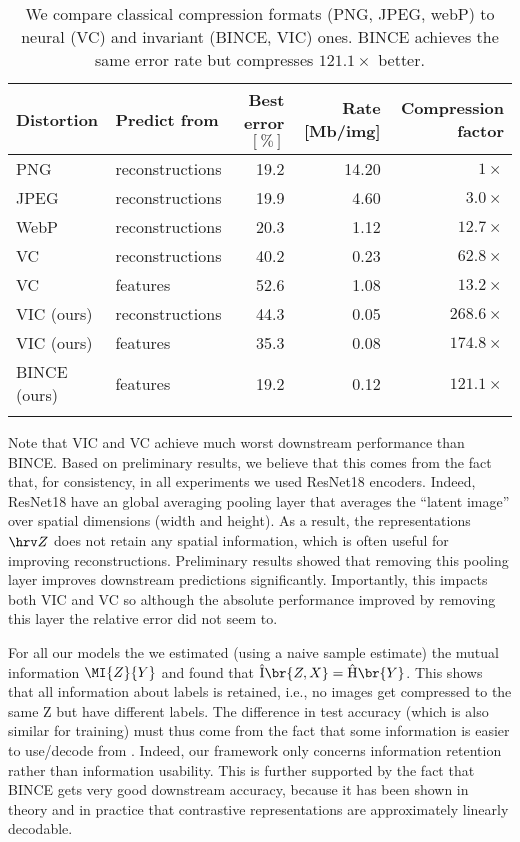 \documentclass[final]{article}
\begin{document}
\begin{table}[ht]
\caption{
We compare classical compression formats (PNG, JPEG, webP) to neural (VC) and invariant (BINCE, VIC) ones. 
BINCE achieves the same error rate but compresses $ 121.1 \times$ better.
}
\center
\small
\begin{tabular}{llrrr}
\toprule
Distortion  & Predict from & Best error $[\%]$  & Rate [Mb/img] & Compression factor\\ 
\midrule 
PNG \cite{graphics_png_isoiec_2003}    &  reconstructions   &  19.2 & 14.20 & $ 1\times$ \\
JPEG  \cite{group_jpeg_itu-t_1992} &  reconstructions   &  19.9 &  4.60 & $ 3.0\times$ \\
WebP   \cite{webp_google_2018}&  reconstructions   &  20.3 &   1.12 & $ 12.7\times$ \\
VC     &  reconstructions   &  40.2 &   0.23 & $ 62.8\times$ \\
VC     &  features          &  52.6 &   1.08 & $ 13.2\times$ \\
\midrule 
VIC (ours)   &  reconstructions  &  44.3 &   0.05 & $ 268.6\times$ \\
VIC  (ours)  &  features 	     &  35.3 &   0.08 & $ 174.8\times$ \\
BINCE (ours) &  features         &  19.2 &   0.12 & $ 121.1\times$ \\	
\bottomrule
\label{table:distortion_variation_long}
\end{tabular}
\end{table}

 
Note that VIC and VC achieve much worst downstream performance than BINCE.
Based on preliminary results, we believe that this comes from the fact that, for consistency, in all experiments we used ResNet18 encoders.
Indeed, ResNet18 have an global averaging pooling layer that averages the ``latent image'' over spatial dimensions (width and height).
As a result, the representations $\hrv Z$ does not retain any spatial information, which is often useful for improving reconstructions.
Preliminary results showed that removing this pooling layer improves downstream predictions significantly.
Importantly, this impacts both VIC and VC so although the absolute performance improved by removing this layer the relative error did not seem to.

 For all our models the we estimated (using a naive sample estimate) the mutual information $\MI{Z}{Y}$ and found that $\Hat{\mathrm{I}}\br{Z,X} = \hat{\mathrm{H}}\br{Y}$.  This shows that all information about labels is retained, i.e., no images get compressed to the same Z but have different labels. The difference in test accuracy (which is also similar for training) must thus come from the fact that some information is easier to use/decode from \cite{dubois_learning_2020,xu_theory_2020}.
Indeed, our framework only concerns information retention rather than information usability. 
This is further supported by the fact that BINCE gets very good downstream accuracy, because it has been shown in theory \cite{saunshi_theoretical_2019,tosh_contrastive_2021,lee_predicting_2020} and in practice \cite{chen_simple_2020,oord_representation_2019} that contrastive representations are approximately linearly decodable.
\end{document}
